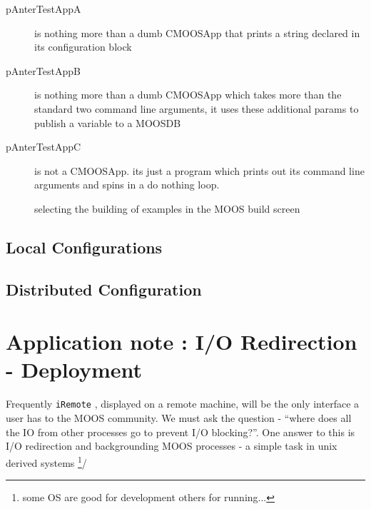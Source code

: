 \documentclass[a4paper,10pt]{article}
\newcommand{\Code}[1]{\texttt{#1} }
\newcommand{\code}[1]{\Code{#1} }
\begin{document}
\begin{description}
\item [pAnterTestAppA] is nothing more than a dumb CMOOSApp that prints a string declared in its configuration block
\item [pAnterTestAppB] is nothing more than a dumb CMOOSApp which takes more than the standard two command line arguments, it uses these additional params to publish a variable to a MOOSDB  
\item [pAnterTestAppC] is not a CMOOSApp. its just a program which prints out its command line arguments and spins in a do nothing loop. 
\
\end{description}

\begin{figure}\label{Fig:Build}
\centering
{}
\caption{selecting the building of examples in the MOOS build screen}
\end{figure} 


\subsection{Local Configurations}\label{Sec:Local}




\subsection{Distributed Configuration}\label{Sec:Distrib}



\section{Application note : I/O Redirection - Deployment} 
Frequently \code{iRemote}, displayed on a remote machine, will be
the only interface a user has to the MOOS community.  We
must ask the question -  ``where does all the IO from other
processes go to prevent I/O blocking?''. One answer to this is I/O
redirection and backgrounding MOOS processes - a simple task in
unix derived systems \footnote{some OS are good for development
others for running...}/
\end{document}
